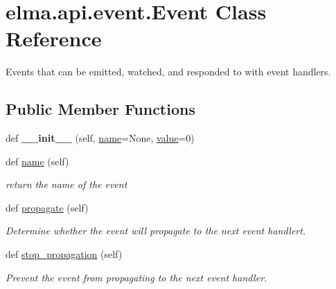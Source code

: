 \hypertarget{classelma_1_1api_1_1event_1_1Event}{}\section{elma.\+api.\+event.\+Event Class Reference}
\label{classelma_1_1api_1_1event_1_1Event}


Events that can be emitted, watched, and responded to with event handlers.  


\subsection*{Public Member Functions}
\begin{DoxyCompactItemize}
\item 
\mbox{\label{classelma_1_1api_1_1event_1_1Event_aed8d4b5c4d860cfd15b66cf7137395a3}} 
def {\bfseries \+\_\+\+\_\+init\+\_\+\+\_\+} (self, \hyperlink{classelma_1_1api_1_1event_1_1Event_aff9b51b4633b58b32e4cb04d9fca568d}{name}=None, \hyperlink{classelma_1_1api_1_1event_1_1Event_a26e3c222b0421cd70d66041466e0b189}{value}=0)
\item 
def \hyperlink{classelma_1_1api_1_1event_1_1Event_aff9b51b4633b58b32e4cb04d9fca568d}{name} (self)
\begin{DoxyCompactList}\small\item\em return the name of the event \end{DoxyCompactList}\item 
def \hyperlink{classelma_1_1api_1_1event_1_1Event_a5912a8957bf49373f95a5646c861a905}{propagate} (self)
\begin{DoxyCompactList}\small\item\em Determine whether the event will propagate to the next event handlert. \end{DoxyCompactList}\item 
def \hyperlink{classelma_1_1api_1_1event_1_1Event_a2b670f52655e83d9ab9f80385f5917ff}{stop\+\_\+propagation} (self)
\begin{DoxyCompactList}\small\item\em Prevent the event from propagating to the next event handler. \end{DoxyCompactList}\item 
\mbox{\label{classelma_1_1api_1_1event_1_1Event_a5b44cfed288e84f52d13b9082fe09b5c}} 

\end{DoxyCompactItemize}
